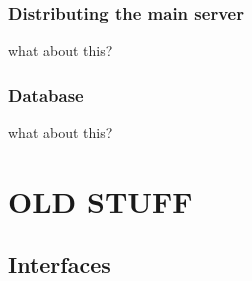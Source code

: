 \documentclass[11pt]{article} %
\begin{document}
\subsubsection{Distributing the main server}

{\color{red} {what about this?}}

\subsubsection{Database}

{\color{red} {what about this?}}



















\newpage
\section{OLD STUFF}

\subsection{Interfaces}
\end{document}
